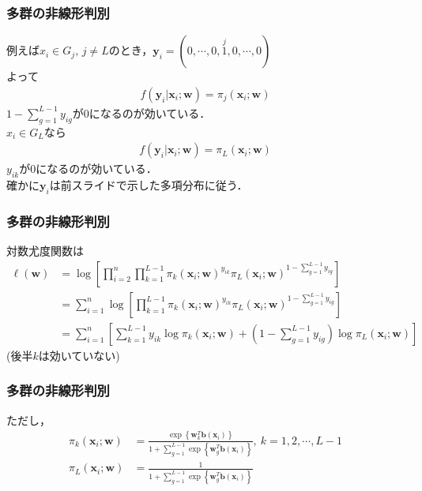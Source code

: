 \documentclass[dvipdfmx,cjk]{beamer}
\theoremstyle{example}
\begin{document}
\begin{frame}
    \frametitle{多群の非線形判別}
    例えば$x_i \in G_j,\, j \neq L$のとき，$\boldsymbol{y}_i=(0,\cdots,0,\overset{j}{1},0,\cdots ,0)$\\
    よって
    \begin{align*}
        f(\boldsymbol{y}_i|\boldsymbol{x}_i;\boldsymbol{w})=\pi_j(\boldsymbol{x}_i;\boldsymbol{w})
    \end{align*}
    $1-\sum\limits_{g=1}^{L-1}y_{ig}$が$0$になるのが効いている．\\
    $x_i \in G_L$なら
    \begin{align*}
        f(\boldsymbol{y}_i|\boldsymbol{x}_i;\boldsymbol{w})=\pi_L(\boldsymbol{x}_i;\boldsymbol{w})
    \end{align*}
    $y_{ik}$が$0$になるのが効いている．\\
    確かに$\boldsymbol{y}_i$は前スライドで示した多項分布に従う．
\end{frame}
\begin{frame}
    \frametitle{多群の非線形判別}
    対数尤度関数は
    \begin{align*}
        \ell (\boldsymbol{w}) & =\log\left[ \prod_{i=2}^{n} \prod_{k=1}^{L-1}\pi_k(\boldsymbol{x}_i;\boldsymbol{w})^{y_{ik}}\pi_L(\boldsymbol{x}_i;\boldsymbol{w})^{1-\sum\limits_{g=1}^{L-1}y_{ig}}\right] \\
                              & =\sum_{i=1}^{n}\log \left[\prod_{k=1}^{L-1}\pi_k(\boldsymbol{x}_i;\boldsymbol{w})^{y_{ik}}\pi_L(\boldsymbol{x}_i;\boldsymbol{w})^{1-\sum\limits_{g=1}^{L-1}y_{ig}}  \right] \\
                              & =\sum_{i=1}^{n}\left[\sum_{k=1}^{L-1}y_{ik}\log \pi_k(\boldsymbol{x}_i;\boldsymbol{w})+(1-\sum_{g=1}^{L-1}y_{ig})\log \pi_L(\boldsymbol{x}_i;\boldsymbol{w})\right]
    \end{align*}
    (後半$k$は効いていない)
\end{frame}
\begin{frame}
    \frametitle{多群の非線形判別}
    ただし，
    \begin{align*}
        \pi_k(\boldsymbol{x}_i;\boldsymbol{w}) & =\frac{\exp\left\{\boldsymbol{w}_k^T\boldsymbol{b}(\boldsymbol{x}_i)\right\}}{1+\sum\limits_{g=1}^{L-1}\exp\left\{\boldsymbol{w}_g^T\boldsymbol{b}(\boldsymbol{x}_i)\right\}}, \: k=1,2,\cdots,L-1 \\
        \pi_L(\boldsymbol{x}_i;\boldsymbol{w}) & =\frac{1}{1+\sum\limits_{g=1}^{L-1}\exp\left\{\boldsymbol{w}_g^T\boldsymbol{b}(\boldsymbol{x}_i)\right\}}
    \end{align*}
\end{frame}
\end{document}

